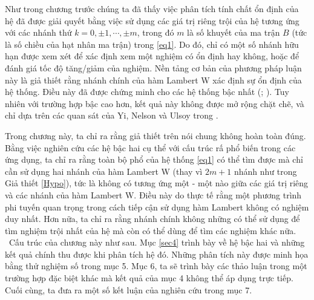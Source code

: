 %
Như trong chương trước chúng ta đã thấy việc phân tích tính chất ổn định của hệ đã được giải quyết bằng việc sử dụng các giá trị riêng trội của hệ tương ứng với các nhánh thứ 
$k = 0, \pm 1 , \cdots , \pm m$, trong đó $m$ là số khuyết của ma trận $B$ (tức là số chiều của hạt nhân ma trận) trong \eqref{eq1}. Do đó, chỉ có một số nhánh hữu hạn được xem xét để xác định xem một nghiệm có ổn định hay không, hoặc để đánh giá tốc độ tăng/giảm của nghiệm. 
Nền tảng cơ bản của phương pháp luận này là giả thiết rằng nhánh chính của hàm Lambert W xác định sự ổn định của hệ thống. Điều này đã được chứng minh cho các hệ thống bậc nhất (\cite{AslU03}; \cite{Shi06}). Tuy nhiên với trường hợp bậc cao hơn, kết quả này không được mở rộng chặt chẽ, và chỉ dựa trên các quan sát của Yi, Nelson và Ulsoy trong \cite{Yi07}.

 
Trong chương này, ta chỉ ra rằng giả thiết trên nói chung không hoàn toàn đúng. Bằng việc nghiên cứu các hệ bậc hai cụ thể với cấu trúc rấ phổ biến trong các ứng dụng, ta chỉ ra rằng toàn bộ phổ của hệ thống \eqref{eq1} có thể tìm được mà chỉ cần sử dụng hai nhánh của hàm Lambert W (thay vì $2m+1$ nhánh như trong Giả thiết \ref{Hypo}), tức là không có tương ứng một - một nào giữa các giá trị riêng và các nhánh của hàm Lambert W. Điều này do thực tế rằng một phương trình phi tuyến quan trọng trong cách tiếp cận sử dụng hàm Lambert không có nghiệm duy nhất. Hơn nữa, ta chỉ ra rằng nhánh chính không những có thể sử dụng để tìm nghiệm trội nhất của hệ mà còn có thể dùng để tìm các nghiệm khác nữa. \ Cấu trúc của chương này như sau. Mục \ref{sec4} trình bày về hệ bậc hai và những kết quả chính thu được khi phân tích hệ đó. Những phân tích này được minh họa bằng thử nghiệm số trong mục 5. Mục 6, ta sẽ trình bày các thảo luận trong một trường hợp đặc biệt khác mà kết quả của mục 4 không thể áp dụng trực tiếp. Cuối cùng, ta đưa ra một số kết luận của nghiên cứu trong mục 7.\\


